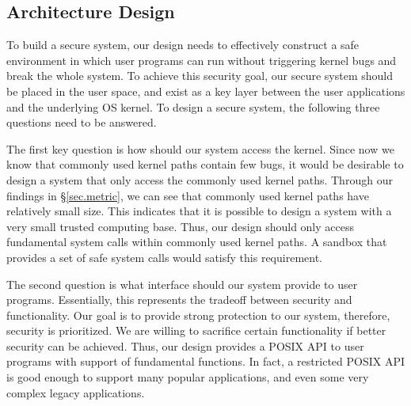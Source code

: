 \subsection{Architecture Design}
To build a secure system, our design needs to effectively construct a safe environment in which user programs 
can run without triggering kernel bugs and break the whole system. 
To achieve this security goal, 
our secure system should be placed in the user space, and exist as a key layer between the user applications 
and the underlying OS kernel. To design a secure system, the following three 
questions need to be answered. 

The first key question is how should our system access the kernel. Since now we know 
that commonly used kernel paths contain few bugs, it would be desirable to design a system that only access the 
commonly used kernel paths. Through our findings in \S{\ref{sec.metric}}, we can see that commonly used kernel paths have relatively 
small size. This indicates that it is possible to design a system with a very small 
trusted computing base. Thus, our design should only access fundamental system 
calls within commonly used kernel paths. A sandbox that provides a 
set of safe system calls would satisfy this requirement.

The second question is what interface should our system provide to user programs. 
Essentially, this represents the tradeoff between 
security and functionality. Our goal is to provide strong protection to our system, therefore, security is prioritized. We are willing 
to sacrifice certain functionality if better security can be achieved.  
Thus, our design provides a POSIX API to user programs with 
support of fundamental functions. In fact, a restricted POSIX API is good enough to support many popular applications, 
and even some very complex legacy applications. 

